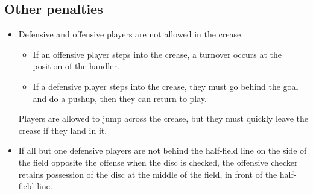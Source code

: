 \documentclass[10pt]{article}
\begin{document}
    \subsection{Other penalties}
    \begin{itemize}
        \item Defensive and offensive players are not allowed in the crease. 
        \begin{itemize}
            \item If an offensive player steps into the crease, a turnover occurs at the position of the handler.
            \item If a defensive player steps into the crease, they must go behind the goal and do a pushup, then they can return to play.
        \end{itemize}
        Players are allowed to jump across the crease, but they must quickly leave the crease if they land in it.
        \item If all but one defensive players are not behind the half-field line on the side of the field opposite the offense when the disc is checked, the offensive checker retains possession of the disc at the middle of the field, in front of the half-field line.
    \end{itemize}
\end{document}
